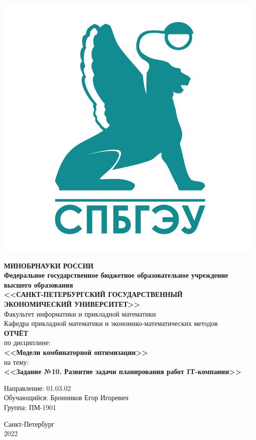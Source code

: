 \documentclass[14pt,fleqn]{extarticle}
\begin{document}
	\begin{titlepage}
		\includegraphics[scale=0.12]{logo}
		\begin{center}
			\textbf{МИНОБРНАУКИ РОССИИ}\\
			\vspace{0.2cm}
			\textbf{Федеральное государственное бюджетное образовательное учреждение высшего образования}\\
			\textbf{<<САНКТ-ПЕТЕРБУРГСКИЙ ГОСУДАРСТВЕННЫЙ ЭКОНОМИЧЕСКИЙ УНИВЕРСИТЕТ>>}\\
			\vspace{0.6cm}
			Факультет информатики и прикладной математики\\
			Кафедра прикладной математики и экономико-математических методов\\
			\vspace{1cm}
			\textbf{ОТЧЁТ}\\
			по дисциплине:\\
			\textbf{<<Модели комбинаторной оптимизации>>}\\
			на тему:\\
			\textbf{<<Задание №10. Развитие задачи планирования работ IT-компании>>}\\
		\end{center}
		\vspace{1cm}
		Направление: 01.03.02\\
		Обучающийся: Бронников Егор Игоревич\\
		Группа: ПМ-1901\\
		\vfill
		\begin{center}
			Санкт-Петербург\\
			2022\\
		\end{center}
	\end{titlepage}
	
\end{document}
